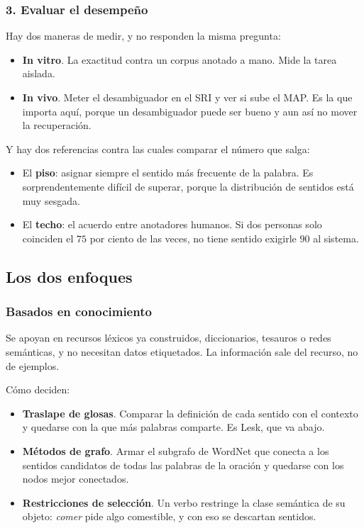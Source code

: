 \documentclass[11pt,letterpaper]{article}
\begin{document}
\subsubsection*{3. Evaluar el desempeño}

Hay dos maneras de medir, y no responden la misma pregunta:

\begin{itemize}[itemsep=0.2em]
    \item \textbf{In vitro}. La exactitud contra un corpus anotado a
          mano. Mide la tarea aislada.
    \item \textbf{In vivo}. Meter el desambiguador en el SRI y ver si
          sube el MAP. Es la que importa aquí, porque un
          desambiguador puede ser bueno y aun así no mover la
          recuperación.
\end{itemize}

Y hay dos referencias contra las cuales comparar el número que salga:

\begin{itemize}[itemsep=0.2em]
    \item El \textbf{piso}: asignar siempre el sentido más frecuente
          de la palabra. Es sorprendentemente difícil de superar,
          porque la distribución de sentidos está muy sesgada.
    \item El \textbf{techo}: el acuerdo entre anotadores humanos. Si
          dos personas solo coinciden el $75$ por ciento de las
          veces, no tiene sentido exigirle $90$ al sistema.
\end{itemize}

\subsection*{Los dos enfoques}

\subsubsection*{Basados en conocimiento}

Se apoyan en recursos léxicos ya construidos, diccionarios, tesauros
o redes semánticas, y no necesitan datos etiquetados. La información
sale del recurso, no de ejemplos.

Cómo deciden:

\begin{itemize}[itemsep=0.2em]
    \item \textbf{Traslape de glosas}. Comparar la definición de cada
          sentido con el contexto y quedarse con la que más palabras
          comparte. Es Lesk, que va abajo.
    \item \textbf{Métodos de grafo}. Armar el subgrafo de WordNet que
          conecta a los sentidos candidatos de todas las palabras de
          la oración y quedarse con los nodos mejor conectados.
    \item \textbf{Restricciones de selección}. Un verbo restringe la
          clase semántica de su objeto: \textit{comer} pide algo
          comestible, y con eso se descartan sentidos.
\end{itemize}
\end{document}
